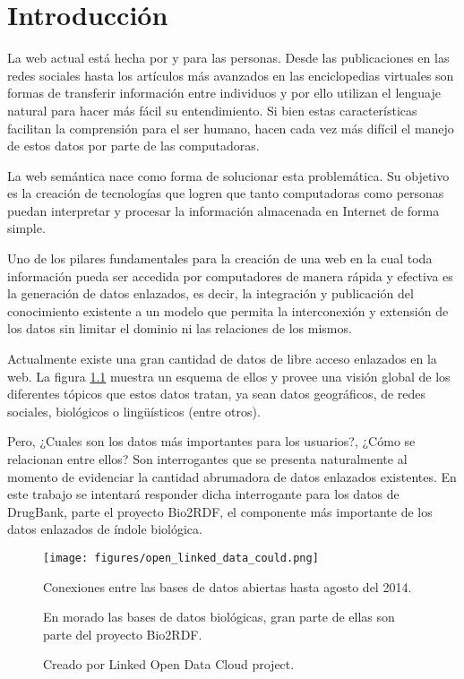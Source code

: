 
\chapter{Introducción}

La web actual está hecha por y para las personas. Desde las publicaciones en las
redes sociales hasta los artículos más avanzados en las enciclopedias virtuales
son formas de transferir información entre individuos y por ello utilizan el
lenguaje natural para hacer más fácil su entendimiento. Si bien estas
características facilitan la comprensión para el ser humano, hacen cada
vez más difícil el manejo de estos datos por parte de las computadoras.

La web semántica nace como forma de solucionar esta problemática. Su objetivo es
la creación de tecnologías que logren que tanto computadoras como personas
puedan interpretar y procesar la información almacenada en Internet
de forma simple.

Uno de los pilares fundamentales para la creación de una web en la cual toda
información pueda ser accedida por computadores de manera rápida y efectiva es
la generación de datos enlazados, es decir, la integración y publicación del 
conocimiento existente a un modelo que permita la interconexión y extensión de
los datos sin limitar el dominio ni las relaciones de los mismos.

Actualmente existe una gran cantidad de datos de libre acceso enlazados en la
web. La figura \ref{fig:cloud} muestra un esquema de ellos y provee una visión
global de los diferentes tópicos que estos datos tratan, ya sean datos
geográficos, de redes sociales, biológicos o lingüísticos (entre otros).

Pero, ¿Cuales son los datos más importantes para los usuarios?, ¿Cómo se
relacionan entre ellos? Son interrogantes que se presenta naturalmente al
momento de evidenciar la cantidad abrumadora de datos enlazados existentes.
En este trabajo se intentará responder dicha interrogante para los datos de
DrugBank, parte el proyecto Bio2RDF, el componente más importante de los datos
enlazados de índole biológica.

\begin{figure}[ht]
  \centering
  \texttt{[image: figures/open\_linked\_data\_could.png]}
  \caption{Conexiones entre las bases de datos abiertas hasta agosto del 2014.}
  \vspace{-.2cm}
  \caption*{En morado las bases de datos biológicas, gran parte de ellas son
  parte del proyecto Bio2RDF.}
  \vspace{-.2cm}
  \caption*{Creado por Linked Open Data Cloud project\cite{lod:cloud}.}
  \label{fig:cloud}
\end{figure}
~\vspace{-1cm}
